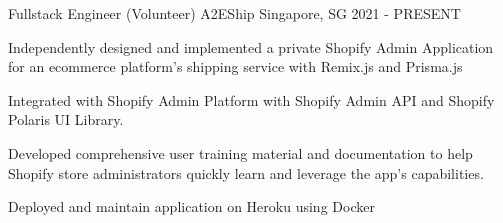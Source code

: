 \begin{cventries}
  \cventry
  {Fullstack Engineer (Volunteer)} %
  {A2EShip} %
  {Singapore, SG}
  {2021 - PRESENT}
  {
    \begin{cvitems} %
      \item Independently designed and implemented a private Shopify Admin Application for
      an ecommerce platform's shipping service with Remix.js and Prisma.js
      \item Integrated with Shopify Admin Platform with Shopify Admin API and Shopify
      Polaris UI Library.
      \item Developed comprehensive user training material and documentation to help
      Shopify store administrators quickly learn and leverage the app's capabilities.
      \item Deployed and maintain application on Heroku using Docker
    \end{cvitems}
  }
\end{cventries}
